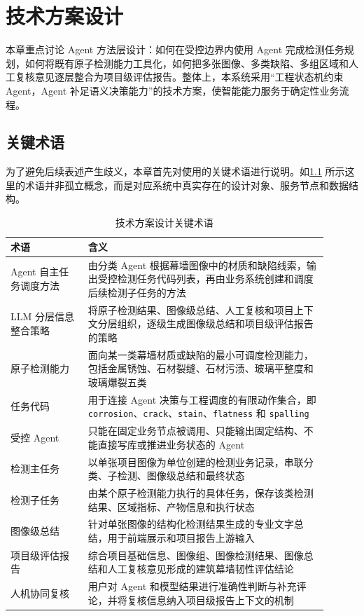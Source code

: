 \chapter{技术方案设计}
\label{chap:design}

本章重点讨论 Agent 方法层设计：如何在受控边界内使用 Agent 完成检测任务规划，如何将既有原子检测能力工具化，如何把多张图像、多类缺陷、多组区域和人工复核意见逐层整合为项目级评估报告。整体上，本系统采用“工程状态机约束 Agent，Agent 补足语义决策能力”的技术方案，使智能能力服务于确定性业务流程。

\section{关键术语}
\label{sec:design-key-terms}

为了避免后续表述产生歧义，本章首先对使用的关键术语进行说明。如\cref{tab:design-key-terms} 所示这里的术语并非孤立概念，而是对应系统中真实存在的设计对象、服务节点和数据结构。

\begin{table}[!htb]
  \caption{技术方案设计关键术语}\label{tab:design-key-terms}
  \centering
  \begin{tabular}{@{}p{0.22\linewidth}p{0.68\linewidth}@{}} \toprule
    \textbf{术语} & \textbf{含义} \\ \midrule
    Agent 自主任务调度方法 & 由分类 Agent 根据幕墙图像中的材质和缺陷线索，输出受控检测任务代码列表，再由业务系统创建和调度后续检测子任务的方法 \\
    LLM 分层信息整合策略 & 将原子检测结果、图像级总结、人工复核和项目上下文分层组织，逐级生成图像级总结和项目级评估报告的策略 \\
    原子检测能力 & 面向某一类幕墙材质或缺陷的最小可调度检测能力，包括金属锈蚀、石材裂缝、石材污渍、玻璃平整度和玻璃爆裂五类 \\
    任务代码 & 用于连接 Agent 决策与工程调度的有限动作集合，即 \texttt{corrosion}、\texttt{crack}、\texttt{stain}、\texttt{flatness} 和 \texttt{spalling} \\
    受控 Agent & 只能在固定业务节点被调用、只能输出固定结构、不能直接写库或推进业务状态的 Agent \\
    检测主任务 & 以单张项目图像为单位创建的检测业务记录，串联分类、子检测、图像级总结和最终状态 \\
    检测子任务 & 由某个原子检测能力执行的具体任务，保存该类检测结果、区域指标、产物信息和执行状态 \\
    图像级总结 & 针对单张图像的结构化检测结果生成的专业文字总结，用于前端展示和项目报告上游输入 \\
    项目级评估报告 & 综合项目基础信息、图像组、图像检测结果、图像总结和人工复核意见形成的建筑幕墙韧性评估结论 \\
    人机协同复核 & 用户对 Agent 和模型结果进行准确性判断与补充评论，并将复核信息纳入项目级报告上下文的机制 \\ \bottomrule
  \end{tabular}
\end{table}

